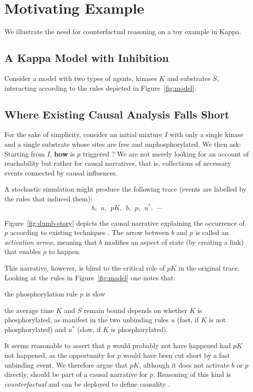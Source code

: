\section{Motivating Example}

We illustrate the need for counterfactual reasoning on a toy example in Kappa. 

\subsection{A Kappa Model with Inhibition}
Consider a model with two types of agents, kinases $K$ and substrates $S$, 
interacting according to the rules depicted in Figure~\ref{fig:model}.


\subsection{Where Existing Causal Analysis Falls Short}
For the sake of simplicity, consider an initial mixture $I$ with only a 
single kinase and a single substrate whose sites are free and unphosphorylated. 
We then ask: Starting from $I$, \textbf{how} is $p$ triggered ? 
We are not merely looking for an account of reachability but rather for 
causal narratives, that is, collections of necessary events connected by 
causal influences.

A stochastic simulation \cite{DanosEtAl-APLAS07} might produce
the following trace (events are labelled by the rules that induced them):
\[b,\ \  u,\ \  pK,\ \  b,\ \  p,\ \  u^{*},\ \  \cdots\]

Figure~\ref{fig:dumb-story} depicts the causal narrative explaining 
the occurrence of $p$ according to existing techniques
\cite{DBLP:conf/fsttcs/DanosFFHH12,DanosEtAl-CONCUR07}. 
The arrow between $b$ and $p$ is called an \textit{activation arrow}, 
meaning that $b$ modifies an aspect of state (by creating a link) that 
enables $p$ to happen.


This narrative, however, is blind to the critical role of $pK$ in the original 
trace. Looking at the rules in Figure~\ref{fig:model} one notes that:
\begin{inparaenum}[(i)]
\item the phosphorylation rule $p$ is slow
\item the average time $K$ and $S$ remain bound
depends on whether $K$ is phosphorylated, as manifest
in the two unbinding rules $u$ (fast, if $K$ is not phosphorylated) 
and $u^{*}$ (slow, if $K$ is phosphorylated).
\end{inparaenum}
It seems reasonable to assert that $p$ would probably not have happened had 
$pK$ not happened, as the opportunity for $p$ would have been cut short by a 
fast unbinding event. We therefore argue that $pK$, although it does not 
activate $b$ or $p$ directly, should be part of a causal narrative for $p$. 
Reasoning of this kind is \textit{counterfactual} and can be deployed 
to define causality \cite{lewis1974causation, lewis2000causation}.

